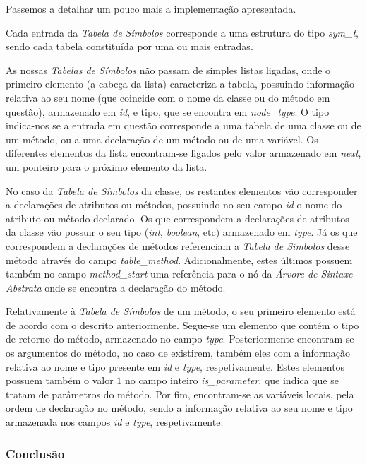 \documentclass[11pt,a4paper]{article}
\begin{document}
	Passemos a detalhar um pouco mais a implementação apresentada.
	
	Cada entrada da \emph{Tabela de Símbolos} corresponde a uma estrutura do tipo \emph{sym\_t}, sendo cada tabela constituída por uma ou mais entradas.
	
	As nossas \emph{Tabelas de Símbolos} não passam de simples listas ligadas, onde o primeiro elemento (a cabeça da lista) caracteriza a tabela, possuindo informação relativa ao seu nome (que coincide com o nome da classe ou do método em questão), armazenado em \emph{id}, e tipo, que se encontra em \emph{node\_type}. O tipo indica-nos se a entrada em questão corresponde a uma tabela de uma classe ou de um método, ou a uma declaração de um método ou de uma variável. Os diferentes elementos da lista encontram-se ligados pelo valor armazenado em \emph{next}, um ponteiro para o próximo elemento da lista.
	
	No caso da \emph{Tabela de Símbolos} da classe, os restantes elementos vão corresponder a declarações de atributos ou métodos, possuindo no seu campo \emph{id} o nome do atributo ou método declarado. Os que correspondem a declarações de atributos da classe vão possuir o seu tipo (\emph{int}, \emph{boolean}, etc) armazenado em \emph{type}. Já os que correspondem a declarações de métodos referenciam a \emph{Tabela de Símbolos} desse método através do campo  \emph{table\_method}. Adicionalmente, estes últimos possuem também no campo \emph{method\_start} uma referência para o nó da \emph{Árvore de Sintaxe Abstrata} onde se encontra a declaração do método.
	
	Relativamente à \emph{Tabela de Símbolos} de um método, o seu primeiro elemento está de acordo com o descrito anteriormente. Segue-se um elemento que contém o tipo de retorno do método, armazenado no campo \emph{type}. Posteriormente encontram-se os argumentos do método, no caso de existirem, também eles com a informação relativa ao nome e tipo presente em \emph{id} e \emph{type}, respetivamente. Estes elementos possuem também o valor $1$ no campo inteiro \emph{is\_parameter}, que indica que se tratam de parâmetros do método. Por fim, encontram-se as variáveis locais, pela ordem de declaração no método, sendo a informação relativa ao seu nome e tipo armazenada nos campos \emph{id} e \emph{type}, respetivamente.
	
	\subsubsection{Conclusão}
	
\end{document}
